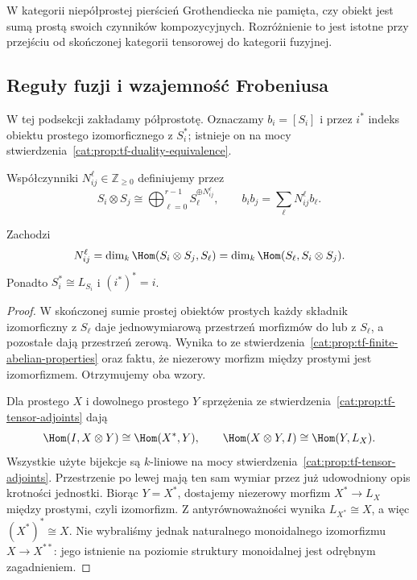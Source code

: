 W kategorii niepółprostej pierścień Grothendiecka nie pamięta, czy obiekt jest sumą prostą swoich czynników kompozycyjnych. Rozróżnienie to jest istotne przy przejściu od skończonej kategorii tensorowej do kategorii fuzyjnej.

\subsection{Reguły fuzji i wzajemność Frobeniusa}

W tej podsekcji zakładamy półprostotę. Oznaczamy $b_i=[S_i]$ i przez $i^*$ indeks obiektu prostego izomorficznego z $S_i^*$; istnieje on na mocy stwierdzenia~\ref{cat:prop:tf-duality-equivalence}.

\begin{definicja}\label{cat:def:tf-fusion-coefficients}
Współczynniki $N_{ij}^{\ell}\in\mathbb Z_{\geq0}$ definiujemy przez
\[
 S_i\otimes S_j\cong\bigoplus_{\ell=0}^{r-1}
 S_\ell^{\oplus N_{ij}^{\ell}},\qquad
 b_i b_j=\sum_\ell N_{ij}^{\ell}b_\ell.
\]
\end{definicja}

\begin{stwierdzenie}\label{cat:prop:tf-fusion-hom}
Zachodzi
\[
 N_{ij}^{\ell}=\dim_k\Hom(S_i\otimes S_j,S_\ell)
 =\dim_k\Hom(S_\ell,S_i\otimes S_j).
\]
Ponadto $S_i^*\cong L_{S_i}$ i $(i^*)^*=i$.
\end{stwierdzenie}
\begin{proof}
W skończonej sumie prostej obiektów prostych każdy składnik izomorficzny z $S_\ell$ daje jednowymiarową przestrzeń morfizmów do lub z $S_\ell$, a pozostałe dają przestrzeń zerową. Wynika to ze stwierdzenia~\ref{cat:prop:tf-finite-abelian-properties} oraz faktu, że niezerowy morfizm między prostymi jest izomorfizmem. Otrzymujemy oba wzory.

Dla prostego $X$ i dowolnego prostego $Y$ sprzężenia ze stwierdzenia~\ref{cat:prop:tf-tensor-adjoints} dają
\[
 \Hom(I,X\otimes Y)\cong\Hom(X^*,Y),\qquad
 \Hom(X\otimes Y,I)\cong\Hom(Y,L_X).
\]
Wszystkie użyte bijekcje są $k$-liniowe na mocy stwierdzenia~\ref{cat:prop:tf-tensor-adjoints}. Przestrzenie po lewej mają ten sam wymiar przez już udowodniony opis krotności jednostki. Biorąc $Y=X^*$, dostajemy niezerowy morfizm $X^*\to L_X$ między prostymi, czyli izomorfizm. Z antyrównoważności wynika $L_{X^*}\cong X$, a więc $(X^*)^*\cong X$. Nie wybraliśmy jednak naturalnego monoidalnego izomorfizmu $X\to X^{**}$: jego istnienie na poziomie struktury monoidalnej jest odrębnym zagadnieniem.
\end{proof}

